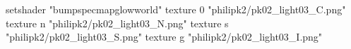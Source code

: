 setshader "bumpspecmapglowworld"
    texture 0 "philipk2/pk02_light03_C.png"
    texture n "philipk2/pk02_light03_N.png"
    texture s "philipk2/pk02_light03_S.png"
    texture g "philipk2/pk02_light03_I.png"